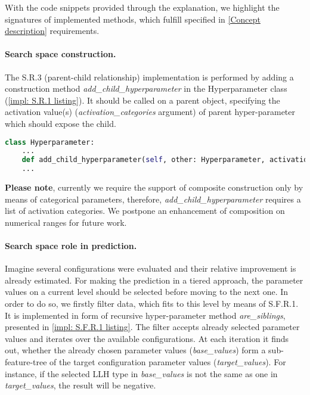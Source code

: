 With the code snippets provided through the explanation, we highlight the signatures of implemented methods, which fulfill specified in \cref{Concept description} requirements.

\paragraph{Search space construction.} The S.R.3 (parent-child relationship) implementation is performed by adding a construction method \emph{add\_child\_hyperparameter} in the Hyperparameter class (\cref{impl: S.R.1 listing}). It should be called on a parent object, specifying the activation value(s) (\emph{activation\_categories} argument) of parent hyper-parameter which should expose the child. 

\begin{lstlisting}[language=Python, caption=S.R.1 implementation., label=impl: S.R.1 listing]
class Hyperparameter:
	...
	def add_child_hyperparameter(self, other: Hyperparameter, activation_categories: Iterable[CATEGORY]) -> Hyperparameter
	...
\end{lstlisting}

\textbf{Please note}, currently we require the support of composite construction only by means of categorical parameters, therefore, \emph{add\_child\_hyperparameter} requires a list of activation categories. We postpone an enhancement of composition on numerical ranges for future work.

\paragraph{Search space role in prediction.}
Imagine several configurations were evaluated and their relative improvement is already estimated. For making the prediction in a tiered approach, the parameter values on a current level should be selected before moving to the next one. In order to do so, we firstly filter data, which fits to this level by means of S.F.R.1. It is implemented in form of recursive hyper-parameter method \emph{are\_siblings}, presented in \cref{impl: S.F.R.1 listing}. The filter accepts already selected parameter values and iterates over the available configurations. At each iteration it finds out, whether the already chosen parameter values (\emph{base\_values}) form a sub-feature-tree of the target configuration parameter values (\emph{target\_values}). For instance, if the selected LLH type in \emph{base\_values} is not the same as one in \emph{target\_values}, the result will be negative.

